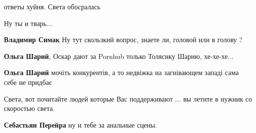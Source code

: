 \begin{itemize}
\begin{itemize}
ответы хуйня. Света обосралась

 
Ну ты и тварь...

 
\textbf{Владимир Симак} Ну тут скользкий вопрос, знаете ли, головой или в голову ?

 
\textbf{Ольга Шарий}, Оскар дают за Pornhub только Толясику Шарию, хе-хе-хе...

 
\textbf{Ольга Шарий} мочіть конкурентів, а то недвіжка на загнівающем западі сама себе не придбає

 
Света, вот почитайте людей которые Вас поддерживают ... вы летите в нужник со скоростью света.

 
\textbf{Себастьян Перейра} ну и тебе за анальные сцены.

 

\end{itemize}
\end{itemize}
